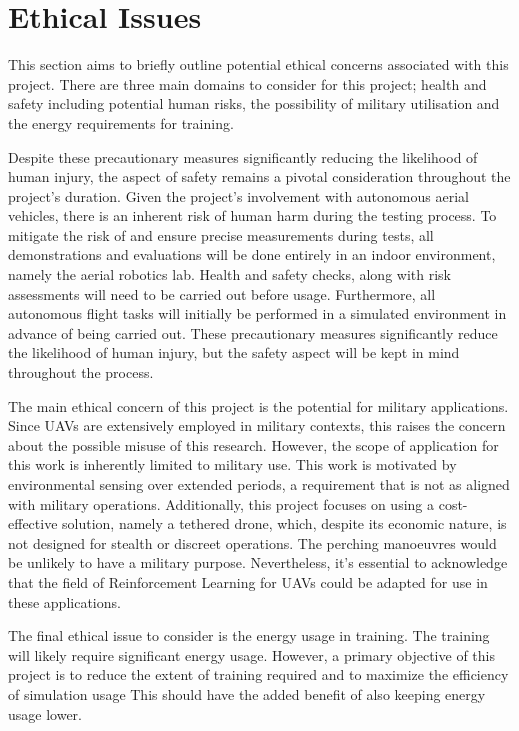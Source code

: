 \chapter{Ethical Issues}

This section aims to briefly outline potential ethical concerns associated with this project.
There are three main domains to consider for this project; health and safety including potential human risks, the possibility of military utilisation and the energy requirements for training.

Despite these precautionary measures significantly reducing the likelihood of human injury, the aspect of safety remains a pivotal consideration throughout the project's duration.
Given the project's involvement with autonomous aerial vehicles, there is an inherent risk of human harm during the testing process.
To mitigate the risk of and ensure precise measurements during tests, all demonstrations and evaluations will be done entirely in an indoor environment, namely the aerial robotics lab.
Health and safety checks, along with risk assessments will need to be carried out before usage.
Furthermore, all autonomous flight tasks will initially be performed in a simulated environment in advance of being carried out.
These precautionary measures significantly reduce the likelihood of human injury, but the safety aspect will be kept in mind throughout the process.

The main ethical concern of this project is the potential for military applications.
Since UAVs are extensively employed in military contexts, this raises the concern about the possible misuse of this research.
However, the scope of application for this work is inherently limited to military use.
This work is motivated by environmental sensing over extended periods, a requirement that is not as aligned with military operations.
Additionally, this project focuses on using a cost-effective solution, namely a tethered drone, which, despite its economic nature, is not designed for stealth or discreet operations.
The perching manoeuvres would be unlikely to have a military purpose.
Nevertheless, it's essential to acknowledge that the field of Reinforcement Learning for UAVs could be adapted for use in these applications.

The final ethical issue to consider is the energy usage in training.
The training will likely require significant energy usage.
However, a primary objective of this project is to reduce the extent of training required and to maximize the efficiency of simulation usage
This should have the added benefit of also keeping energy usage lower.
